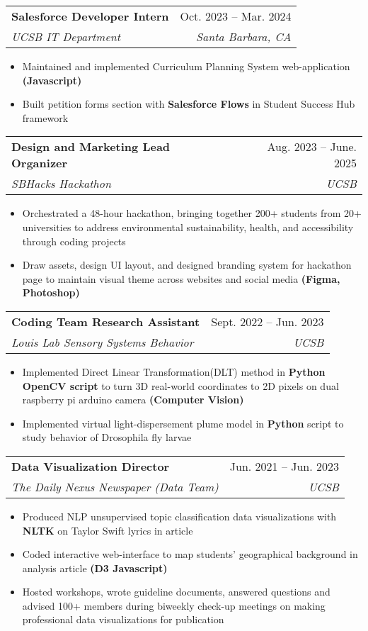 \documentclass[letterpaper,11pt]{article}
\makeatletter
\newcommand{\resumeItem}[1]{
  \item\small{
    {#1 \vspace{-2pt}}
  }
}
\newcommand{\resumeSubheading}[4]{
  \vspace{-2pt}\item
    \begin{tabular*}{0.97\textwidth}[t]{l@{\extracolsep{\fill}}r}
      \textbf{#1} & #2 \\
      \textit{\small#3} & \textit{\small #4} \\
    \end{tabular*}\vspace{-7pt}
}
\newcommand{\resumeSubSubheading}[2]{
    \item
    \begin{tabular*}{0.97\textwidth}{l@{\extracolsep{\fill}}r}
      \textit{\small#1} & \textit{\small #2} \\
    \end{tabular*}\vspace{-7pt}
}
\newcommand{\resumeSubHeadingListEnd}{\end{itemize}}
\newcommand{\resumeItemListStart}{\begin{itemize}}
\newcommand{\resumeItemListEnd}{\end{itemize}\vspace{-5pt}}
\makeatother
\begin{document}

\resumeSubheading
{Salesforce Developer Intern}{Oct. 2023 -- Mar. 2024}
{UCSB IT Department}{Santa Barbara, CA}
\resumeItemListStart
\resumeItem{Maintained and implemented Curriculum Planning System web-application \textbf{(Javascript)}}
\resumeItem{Built petition forms section with \textbf{Salesforce Flows} in Student Success Hub framework}
\resumeItemListEnd

\resumeSubheading
{Design and Marketing Lead Organizer}{Aug. 2023 -- June. 2025}
{SBHacks Hackathon}{UCSB}
\resumeItemListStart
\resumeItem{Orchestrated a 48-hour hackathon, bringing together 200+ students from 20+ universities to address environmental
sustainability, health, and accessibility through coding projects}
\resumeItem{Draw assets, design UI layout, and designed branding system for hackathon page to maintain visual theme across websites
and social media \textbf{(Figma, Photoshop)}}
\resumeItemListEnd

\resumeSubheading
{Coding Team Research Assistant}{Sept. 2022 -- Jun. 2023}
{Louis Lab Sensory Systems Behavior}{UCSB}
\resumeItemListStart
\resumeItem{Implemented Direct Linear Transformation(DLT) method in \textbf{Python OpenCV script} to turn 3D real-world coordinates to
2D pixels on dual raspberry pi arduino camera \textbf{(Computer Vision)}}
\resumeItem{Implemented virtual light-dispersement plume model in \textbf{Python} script to study behavior of Drosophila fly larvae}
\resumeItemListEnd

\resumeSubheading
{Data Visualization Director}{Jun. 2021 -- Jun. 2023}
{The Daily Nexus Newspaper (Data Team)}{UCSB}
\resumeItemListStart
\resumeItem{Produced NLP unsupervised topic classification data visualizations with \textbf{NLTK} on Taylor Swift lyrics in article}
\resumeItem{Coded interactive web-interface to map students' geographical background in analysis article \textbf{(D3 Javascript)}}
\resumeItem{Hosted workshops, wrote guideline documents, answered questions and advised 100+ members during biweekly check-up
meetings on making professional data visualizations for publication}
\resumeItemListEnd
\end{document}
